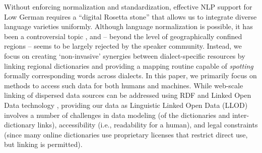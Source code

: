 Without enforcing normalization and standardization, effective NLP support for Low German requires a “digital Rosetta stone” that allows us to integrate diverse language varieties uniformly. Although language normalization is possible, it has been a controversial topic \cite{Christiansen1975}, and -- beyond the level of geographically confined regions -- seems to be largely rejected by the speaker community. Instead, we focus on creating `non-invasive' synergies between dialect-specific resources by linking regional dictionaries and providing a mapping routine capable of \emph{spotting} formally corresponding words across dialects. In this paper, we primarily focus on methods to access such data for both humans and machines. While web-scale linking of dispersed data sources can be addressed using RDF and Linked Open Data technology \cite[p.3-9]{cimiano2020linguistic}, providing our data as Linguistic Linked Open Data (LLOD) involves a number of challenges in data modeling (of the dictionaries and inter-dictionary links), accessibility (i.e., readability for a human), and legal constraints (since many online dictionaries use proprietary licenses that restrict direct use, but linking is permitted).

